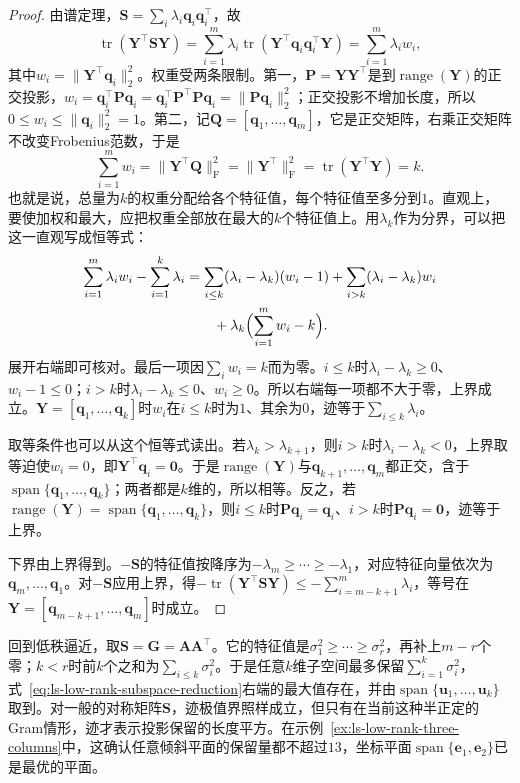 \begin{proof}
由谱定理，$\bm S=\sum_i\lambda_i\bm q_i\bm q_i^\top$，故
\[
 \operatorname{tr}(\bm Y^\top\bm S\bm Y)
 =\sum_{i=1}^m\lambda_i\operatorname{tr}(\bm Y^\top\bm q_i\bm q_i^\top\bm Y)
 =\sum_{i=1}^m\lambda_iw_i,
\]
其中$w_i=\lVert\bm Y^\top\bm q_i\rVert_2^2$。权重受两条限制。第一，$\bm P=\bm Y\bm Y^\top$是到$\operatorname{range}(\bm Y)$的正交投影，$w_i=\bm q_i^\top\bm P\bm q_i=\bm q_i^\top\bm P^\top\bm P\bm q_i=\lVert\bm P\bm q_i\rVert_2^2$；正交投影不增加长度，所以$0\leq w_i\leq\lVert\bm q_i\rVert_2^2=1$。第二，记$\bm Q=[\bm q_1,\ldots,\bm q_m]$，它是正交矩阵，右乘正交矩阵不改变Frobenius范数，于是
\[
 \sum_{i=1}^mw_i=\lVert\bm Y^\top\bm Q\rVert_{\mathrm F}^2=\lVert\bm Y^\top\rVert_{\mathrm F}^2=\operatorname{tr}(\bm Y^\top\bm Y)=k .
\]
也就是说，总量为$k$的权重分配给各个特征值，每个特征值至多分到$1$。直观上，要使加权和最大，应把权重全部放在最大的$k$个特征值上。用$\lambda_k$作为分界，可以把这一直观写成恒等式：
\[
 \begin{aligned}
 \sum_{i=1}^m\lambda_iw_i-\sum_{i=1}^k\lambda_i
 &=\sum_{i\leq k}(\lambda_i-\lambda_k)(w_i-1)+\sum_{i>k}(\lambda_i-\lambda_k)w_i\\
 &\qquad+\lambda_k\Bigl(\sum_{i=1}^mw_i-k\Bigr).
 \end{aligned}
\]
展开右端即可核对。最后一项因$\sum_iw_i=k$而为零。$i\leq k$时$\lambda_i-\lambda_k\geq0$、$w_i-1\leq0$；$i>k$时$\lambda_i-\lambda_k\leq0$、$w_i\geq0$。所以右端每一项都不大于零，上界成立。$\bm Y=[\bm q_1,\ldots,\bm q_k]$时$w_i$在$i\leq k$时为$1$、其余为$0$，迹等于$\sum_{i\leq k}\lambda_i$。

取等条件也可以从这个恒等式读出。若$\lambda_k>\lambda_{k+1}$，则$i>k$时$\lambda_i-\lambda_k<0$，上界取等迫使$w_i=0$，即$\bm Y^\top\bm q_i=\bm0$。于是$\operatorname{range}(\bm Y)$与$\bm q_{k+1},\ldots,\bm q_m$都正交，含于$\operatorname{span}\{\bm q_1,\ldots,\bm q_k\}$；两者都是$k$维的，所以相等。反之，若$\operatorname{range}(\bm Y)=\operatorname{span}\{\bm q_1,\ldots,\bm q_k\}$，则$i\leq k$时$\bm P\bm q_i=\bm q_i$、$i>k$时$\bm P\bm q_i=\bm0$，迹等于上界。

下界由上界得到。$-\bm S$的特征值按降序为$-\lambda_m\geq\cdots\geq-\lambda_1$，对应特征向量依次为$\bm q_m,\ldots,\bm q_1$。对$-\bm S$应用上界，得$-\operatorname{tr}(\bm Y^\top\bm S\bm Y)\leq-\sum_{i=m-k+1}^m\lambda_i$，等号在$\bm Y=[\bm q_{m-k+1},\ldots,\bm q_m]$时成立。
\end{proof}

回到低秩逼近，取$\bm S=\bm G=\bm A\bm A^\top$。它的特征值是$\sigma_1^2\geq\cdots\geq\sigma_r^2$，再补上$m-r$个零；$k<r$时前$k$个之和为$\sum_{i\leq k}\sigma_i^2$。于是任意$k$维子空间最多保留$\sum_{i=1}^k\sigma_i^2$，式~\eqref{eq:ls-low-rank-subspace-reduction}右端的最大值存在，并由$\operatorname{span}\{\bm u_1,\ldots,\bm u_k\}$取到。对一般的对称矩阵$\bm S$，迹极值界照样成立，但只有在当前这种半正定的Gram情形，迹才表示投影保留的长度平方。在示例~\ref{ex:ls-low-rank-three-columns}中，这确认任意倾斜平面的保留量都不超过$13$，坐标平面$\operatorname{span}\{\bm e_1,\bm e_2\}$已是最优的平面。


